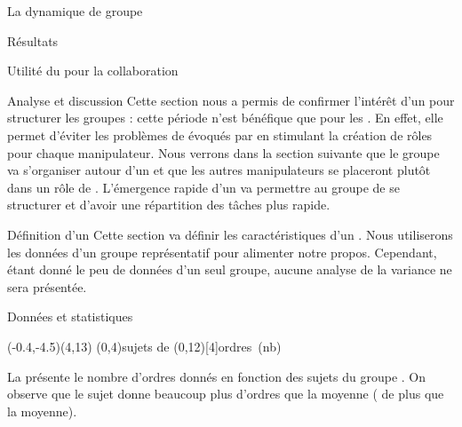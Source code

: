 \documentclass[myfrancais,ngerman,english,frenchb]{mythesis}
\begin{document}
\begin{mychapter}{La dynamique de groupe}
\begin{mysection}{Résultats}
\begin{mysubsection}{Utilité du \mybrainstorming pour la collaboration}
\begin{mysubsubsection}{Analyse et discussion}
					Cette section nous a permis de confirmer l'intérêt d'un \mybrainstorming pour structurer les groupes : cette période n'est bénéfique que pour les .
					En effet, elle permet d'éviter les problèmes de  évoqués par  en stimulant la création de rôles pour chaque manipulateur.
					Nous verrons dans la section suivante que le groupe va s'organiser autour d'un  et que les autres manipulateurs se placeront plutôt dans un rôle de .
					L'émergence rapide d'un  va permettre au groupe de se structurer et d'avoir une répartition des tâches plus rapide.
				\end{mysubsubsection}
			\end{mysubsection}
			\begin{mysubsection}{Définition d'un }
				Cette section va définir les caractéristiques d'un .
				Nous utiliserons les données d'un groupe représentatif pour alimenter notre propos.
				Cependant, étant donné le peu de données d'un seul groupe, aucune analyse de la variance ne sera présentée.
				\begin{mysubsubsection}{Données et statistiques}
					\begin{myfigure}
						\begin{myps}(-0.4,-4.5)(4,13)
							\myaxes(0,4){sujets de }(0,12)[4]{ordres~(nb)}
						\end{myps}
					\end{myfigure}

					La  présente le nombre d'ordres donnés  en fonction des sujets du groupe .
					On observe que le sujet  donne beaucoup plus d'ordres que la moyenne ( de plus que la moyenne).


\end{mysubsubsection}
\end{mysubsection}
\end{mysection}
\end{mychapter}
\end{document}
